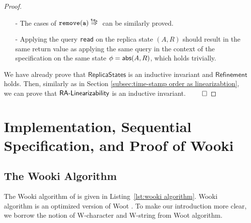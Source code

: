 \begin {proof}
\begin{itemize}
    By the causal delivery assumption, if $\alabel$ is visible to an operation $\alabel'$, then the effector of $\alabel'$ has not been applied in $S'$ yet; if an operation $\alabel''$ is visible to $\alabel$, then the effector of $\alabel''$ has already been applied in $S'$. By Annotation1 of effector $(A'',R'')$, and Annotation2 of replica state $S$, we can see that $A'' \setminus \{ (a,\ats_a) \} \subseteq A$ and $R'' \subseteq R$, and thus, we can see that $A' = A \cup \{ (a,\ats_a) \}$ and $R' = R$.

    Since $\ats_a$ is greater than all the timestamps of operations whose effector have been applied in $S$, by Annotation2 of $S$, we can see that, for each $\ats \in \{ \ats' \vert (\_,\ats') \in S \}$, we have $\ats < \ats_a$. Therefore, we can see that $\refmap(A',R') = \refmap(A,R) \cup \{ a \} = \abstate'$.

\item[-] The cases of $\alabellongind[{\tt remove}]{a}{}{\ats_a}{}$ can be similarly proved.

\item[-] Applying the query {\tt read} on the replica state $(A,R)$ should result in the same return value as applying the same query in the context of the specification on the same state $\phi = \mathsf{abs}(A,R)$, which holds trivially.
\end{itemize}


We have already prove that $\mathsf{ReplicaStates}$ is an inductive invariant and $\mathsf{Refinement}$ holds. Then, similarly as in Section \ref{subsec:time-stamp order as linearizabtion}, we can prove that $\mathsf{RA\text{-}Linearizability{}}$ is an inductive invariant. $\qed$
\end {proof}






\section{Implementation, Sequential Specification, and Proof of Wooki}
\label{sec:implementation, sequential specification, and proof of wooki}



\subsection{The Wooki Algorithm}
\label{subsec:the Wooki algorithm}

The Wooki algorithm of \cite{DBLP:conf/wise/WeissUM07} is given in Listing~\ref{lst:wooki algorithm}. %
Wooki algorithm is an optimized version of Woot \cite{DBLP:conf/cscw/OsterUMI06}. To make our introduction more clear, we borrow the notion of W-character and W-string from Woot algorithm.

